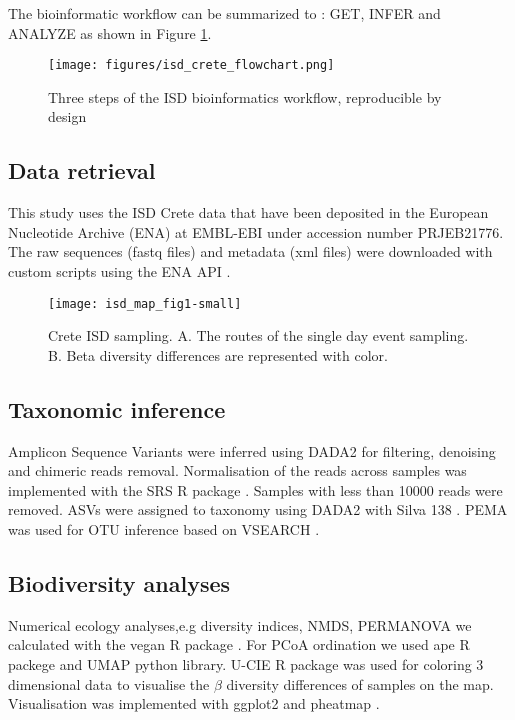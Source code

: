 The bioinformatic workflow can be summarized to : GET, INFER and ANALYZE as shown in Figure \ref{fig:isd_workflow_taxonomy}.

\begin{figure}[h]
      \centering
      \texttt{[image: figures/isd\_crete\_flowchart.png]}
      \caption[Reproducible workflow of ISD analysis]{Three steps of the ISD bioinformatics workflow, reproducible by design}
      \label{fig:isd_workflow_taxonomy}
   \end{figure}
   
\subsection{Data retrieval}\label{isd_get}

This study uses the ISD Crete data that have been deposited
in the European Nucleotide Archive (ENA) at EMBL-EBI under accession number PRJEB21776.
The raw sequences (fastq files) and metadata (xml files) were downloaded with custom scripts using the ENA API \parencite{Yuan2023}.

\begin{figure}[h] 
    \centering\texttt{[image: isd\_map\_fig1-small]}
    \caption{Crete ISD sampling. A. The routes of the single day event sampling. B. Beta diversity differences are represented with color.}
    \label{fig:isd_crete_sampling}
\end{figure}

\subsection{Taxonomic inference}\label{tax_inference}
Amplicon Sequence Variants were inferred using DADA2 \parencite{Callahan2016} for 
filtering, denoising and chimeric reads removal. Normalisation of the reads
across samples was implemented with the SRS R package \parencite{Beule2020}. Samples
with less than 10000 reads were removed. ASVs were assigned to taxonomy using 
DADA2 with Silva 138 \parencite{quast_silva_2013}.
PEMA was used for OTU inference based on VSEARCH \parencite{zafeiropoulos2020pema}.

\subsection{Biodiversity analyses}\label{biodiversity}

Numerical ecology analyses,e.g diversity indices, NMDS, PERMANOVA we calculated
with the vegan R package \parencite{oksanen2024vegan}.
For PCoA ordination we used ape R packege \parencite{Paradis2004} and UMAP python library\parencite{mcinnes2018umap-software}.
U-CIE R package was used for coloring 3 dimensional data \parencite{Koutrouli2022} to 
visualise the $\beta$ diversity differences of samples on the map.
Visualisation was implemented with ggplot2 \parencite{wickham_ggplot2_2016} and pheatmap \parencite{Kolde2019}.


